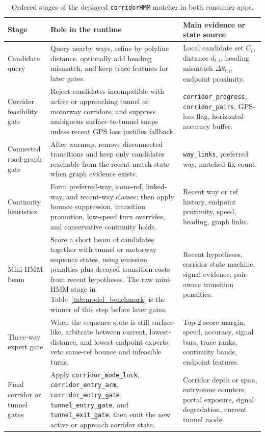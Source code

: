 \documentclass{article}
\begin{document}
\begin{table}[!htbp]
\centering
\scriptsize
\caption{Ordered stages of the deployed \texttt{corridorHMM} matcher in both consumer apps.}
\label{tab:consumer_matcher_stages}
\begin{tabular}{p{2.6cm}p{4.9cm}p{4.5cm}}
\toprule
Stage & Role in the runtime & Main evidence or state source \\
\midrule
Candidate query & Query nearby ways, refine by polyline distance, optionally add heading mismatch, and keep trace features for later gates. & Local candidate set \(C_t\), distance \(d_{t,i}\), heading mismatch \(\Delta \theta_{t,i}\), endpoint proximity. \\
Corridor feasibility gate & Reject candidates incompatible with active or approaching tunnel or motorway corridors, and suppress ambiguous surface-to-tunnel snaps unless recent GPS loss justifies fallback. & \texttt{corridor\_progress}, \texttt{corridor\_pairs}, GPS-loss flag, horizontal-accuracy buffer. \\
Connected road-graph gate & After warmup, remove disconnected transitions and keep only candidates reachable from the recent match state when graph evidence exists. & \texttt{way\_links}, preferred way, matched-fix count. \\
Continuity heuristics & Form preferred-way, same-ref, linked-way, and recent-way classes; then apply bounce suppression, transition promotion, low-speed turn overrides, and conservative continuity holds. & Recent way or ref history, endpoint proximity, speed, heading, graph links. \\
Mini-HMM beam & Score a short beam of candidates together with tunnel or motorway sequence states, using emission penalties plus decayed transition costs from recent hypotheses. The raw mini-HMM stage in Table~\ref{tab:model_benchmark} is the winner of this step before later gates. & Recent hypotheses, corridor state machine, signal evidence, pair-aware transition penalties. \\
Three-way expert gate & When the sequence state is still surface-like, arbitrate between current, lowest-distance, and lowest-endpoint experts; veto same-ref bounce and infeasible turns. & Top-2 score margin, speed, accuracy, signal bars, trace ranks, continuity bands, endpoint features. \\
Final corridor or tunnel gates & Apply \texttt{corridor\_mode\_lock}, \texttt{corridor\_entry\_arm}, \texttt{corridor\_entry\_gate}, \texttt{tunnel\_entry\_gate}, and \texttt{tunnel\_exit\_gate}, then emit the new active or approach corridor state. & Corridor depth or span, entry-zone counters, portal exposure, signal degradation, current tunnel mode. \\
\bottomrule
\end{tabular}
\end{table}
\end{document}
